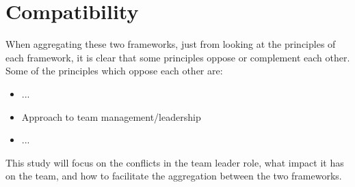 \section{Compatibility}
When aggregating these two frameworks, just from looking at the principles of each framework, it is clear that some principles oppose or complement each other. 
Some of the principles which oppose each other are:
\begin{itemize}
	\item ...
	\item Approach to team management/leadership
	\item ...
\end{itemize} 

This study will focus on the conflicts in the team leader role, what impact it has on the team, and how to facilitate the aggregation between the two frameworks.